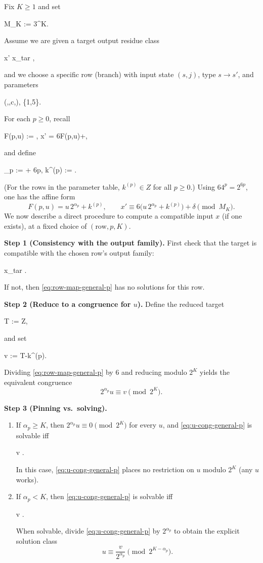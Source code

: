 \documentclass[11pt,letterpaper]{amsart}
\def\mathrm#1{#1}%
\def\mathbb#1{#1}%
\def\[{ }%
\def\]{ }%
\theoremstyle{definition}
\theoremstyle{plain}
\theoremstyle{plain}
\theoremstyle{remark}
\begin{document}
Fix $K\ge 1$ and set
\[
M_K := 3^K.
\]
Assume we are given a target output residue class
\[
x' \equiv x_{\mathrm{tar}} ,
\]
and we choose a specific row (branch) with input state $(s,j)$, type $s\to s'$, and parameters
\[
(\alpha,\beta,c,\delta),
\qquad \delta\in\{1,5\}.
\]
For each $p\ge 0$, recall
\[
F(p,u) := ,
\qquad
x' = 6F(p,u)+\delta,
\]
and define
\[
\alpha_p := \alpha + 6p,
\qquad
k^{(p)} := .
\]
(For the rows in the parameter table, $k^{(p)}\in\mathbb Z$ for all $p\ge 0$.)  Using $64^p=2^{6p}$, one has the affine form
\begin{equation}\label{eq:row-map-general-p}
F(p,u)=u\,2^{\alpha_p}+k^{(p)},
\qquad
x' \equiv 6\bigl(u\,2^{\alpha_p}+k^{(p)}\bigr)+\delta \pmod{M_K}.
\end{equation}
We now describe a direct procedure to compute a compatible input $x$ (if one exists), at a fixed choice of $(\text{row},p,K)$.

\smallskip
\noindent\textbf{Step 1 (Consistency with the output family).}
First check that the target is compatible with the chosen row's output family:
\[
x_{\mathrm{tar}} \equiv \delta {}.
\]
If not, then \eqref{eq:row-map-general-p} has no solutions for this row.

\smallskip
\noindent\textbf{Step 2 (Reduce to a congruence for $u$).}
Define the reduced target
\[
T := \frac{x_{\mathrm{tar}}-\delta}{6}\in\mathbb Z,
\]
and set
\[
v := T-k^{(p)}.
\]
Dividing \eqref{eq:row-map-general-p} by $6$ and reducing modulo $2^K$ yields the equivalent congruence
\begin{equation}\label{eq:u-cong-general-p}
2^{\alpha_p}u \equiv v \pmod{2^K}.
\end{equation}

\smallskip
\noindent\textbf{Step 3 (Pinning vs.\ solving).}
\begin{enumerate}
\item[\emph{(Pinning)}] If $\alpha_p\ge K$, then $2^{\alpha_p}u \equiv 0\pmod{2^K}$ for every $u$, and \eqref{eq:u-cong-general-p} is solvable iff
\[
v  .
\]
In this case, \eqref{eq:u-cong-general-p} places no restriction on $u$ modulo $2^K$ (any $u$ works).
\item[\emph{(Solving)}] If $\alpha_p< K$, then \eqref{eq:u-cong-general-p} is solvable iff
\[
v  .
\]
When solvable, divide \eqref{eq:u-cong-general-p} by $2^{\alpha_p}$ to obtain the explicit solution class
\begin{equation}\label{eq:u-solution-general-p}
u \equiv \frac{v}{2^{\alpha_p}} \pmod{2^{K-\alpha_p}}.
\end{equation}
\end{enumerate}
\end{document}
